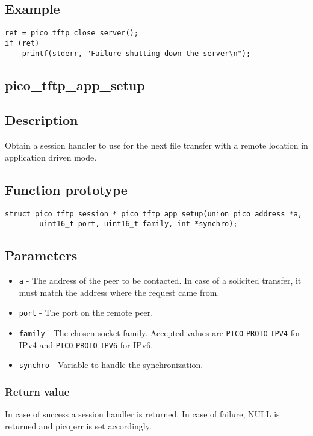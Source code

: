 \subsection*{Example}
\begin{verbatim}
ret = pico_tftp_close_server();
if (ret)
    printf(stderr, "Failure shutting down the server\n");
\end{verbatim}


\subsection{pico\_tftp\_app\_setup}

\subsection*{Description}
Obtain a session handler to use for the next file transfer with a remote location in application driven mode.

\subsection*{Function prototype}
\begin{verbatim}
struct pico_tftp_session * pico_tftp_app_setup(union pico_address *a,
        uint16_t port, uint16_t family, int *synchro);
\end{verbatim}

\subsection*{Parameters}
\begin{itemize}[noitemsep]
\item \texttt{a} - The address of the peer to be contacted. In case of a solicited transfer, it must match the address where the request came from.
\item \texttt{port} - The port on the remote peer.
\item \texttt{family} - The chosen socket family. Accepted values are \texttt{PICO$\_$PROTO$\_$IPV4} for IPv4 and \texttt{PICO$\_$PROTO$\_$IPV6} for IPv6.
\item \texttt{synchro} - Variable to handle the synchronization.
\end{itemize}

\subsubsection*{Return value}
In case of success a session handler is returned. In case of failure, NULL is returned and pico$\_$err is set accordingly.

